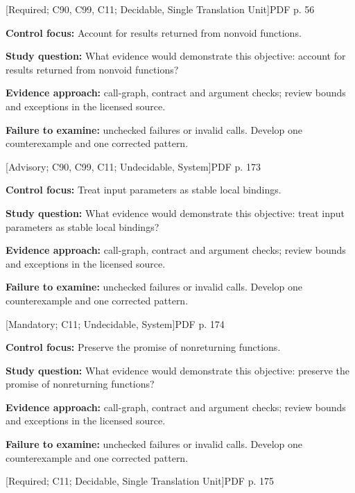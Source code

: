 \documentclass[10pt,letterpaper]{article}
\begin{document}
 \textsf{\footnotesize [Required; C90, C99, C11; Decidable, Single Translation Unit]}\hfill{\footnotesize PDF p. 56}\par
\textbf{Control focus:} Account for results returned from nonvoid functions.\par
\textbf{Study question:} What evidence would demonstrate this objective: account for results returned from nonvoid functions?\par
\textbf{Evidence approach:} call-graph, contract and argument checks; review bounds and exceptions in the licensed source.\par
\textbf{Failure to examine:} unchecked failures or invalid calls. Develop one counterexample and one corrected pattern.\par
\smallskip
{}
 \textsf{\footnotesize [Advisory; C90, C99, C11; Undecidable, System]}\hfill{\footnotesize PDF p. 173}\par
\textbf{Control focus:} Treat input parameters as stable local bindings.\par
\textbf{Study question:} What evidence would demonstrate this objective: treat input parameters as stable local bindings?\par
\textbf{Evidence approach:} call-graph, contract and argument checks; review bounds and exceptions in the licensed source.\par
\textbf{Failure to examine:} unchecked failures or invalid calls. Develop one counterexample and one corrected pattern.\par
\smallskip
{}
 \textsf{\footnotesize [Mandatory; C11; Undecidable, System]}\hfill{\footnotesize PDF p. 174}\par
\textbf{Control focus:} Preserve the promise of nonreturning functions.\par
\textbf{Study question:} What evidence would demonstrate this objective: preserve the promise of nonreturning functions?\par
\textbf{Evidence approach:} call-graph, contract and argument checks; review bounds and exceptions in the licensed source.\par
\textbf{Failure to examine:} unchecked failures or invalid calls. Develop one counterexample and one corrected pattern.\par
\smallskip
{}
 \textsf{\footnotesize [Required; C11; Decidable, Single Translation Unit]}\hfill{\footnotesize PDF p. 175}\par
\end{document}

